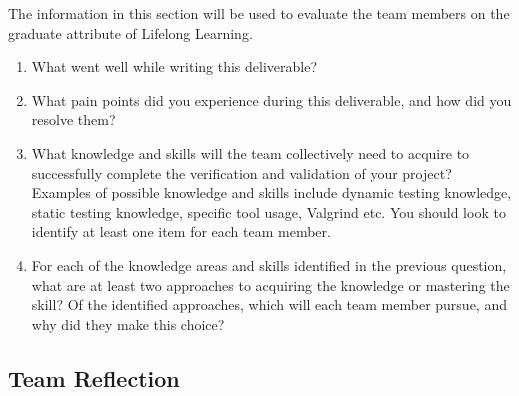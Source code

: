 \documentclass[12pt, titlepage]{article}
\begin{document}
The information in this section will be used to evaluate the team members on the
graduate attribute of Lifelong Learning.



\begin{enumerate}
  \item What went well while writing this deliverable? 
  \item What pain points did you experience during this deliverable, and how
    did you resolve them?
  \item What knowledge and skills will the team collectively need to acquire to
  successfully complete the verification and validation of your project?
  Examples of possible knowledge and skills include dynamic testing knowledge,
  static testing knowledge, specific tool usage, Valgrind etc.  You should look to
  identify at least one item for each team member.
  \item For each of the knowledge areas and skills identified in the previous
  question, what are at least two approaches to acquiring the knowledge or
  mastering the skill?  Of the identified approaches, which will each team
  member pursue, and why did they make this choice?
\end{enumerate}

\subsection*{Team Reflection}
\end{document}
